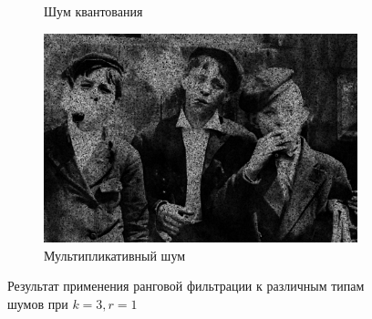 \begin{figure}[ht!]
\begin{subfigure}[b]{0.5\linewidth}
      \caption{Шум квантования} 
      \label{rang_3_1:e}
    \end{subfigure}%
    \begin{subfigure}[b]{0.5\linewidth}
        \centering
        \includegraphics[width=0.95\linewidth]{../Rang_Filter/Rang_Speckle_noise_(k=3,r=1).jpg} 
        \caption{Мультипликативный шум} 
        \label{rang_3_1:f} 
    \end{subfigure} 
    \caption{Результат применения ранговой фильтрации к различным типам шумов при $k = 3, r = 1$}
    \label{img:rang_3_1} 
\end{figure}

